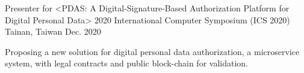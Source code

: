 \begin{cventries}
  \cventry
    {Presenter for <PDAS: A Digital-Signature-Based Authorization Platform for Digital Personal Data>} %
    {2020 International Computer Symposium (ICS 2020)} %
    {Tainan, Taiwan} %
    {Dec. 2020} %
    {
      \begin{cvitems} %
        \item {Proposing a new solution for digital personal data authorization, a microservice system, with legal contracts and public block-chain for validation.}
      \end{cvitems}
    }

\end{cventries}
